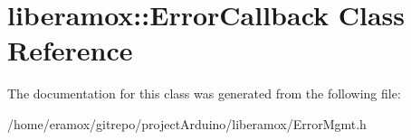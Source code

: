 \hypertarget{classliberamox_1_1ErrorCallback}{}\section{liberamox\+:\+:Error\+Callback Class Reference}
\label{classliberamox_1_1ErrorCallback}


The documentation for this class was generated from the following file\+:\begin{DoxyCompactItemize}
\item 
/home/eramox/gitrepo/project\+Arduino/liberamox/Error\+Mgmt.\+h\end{DoxyCompactItemize}
